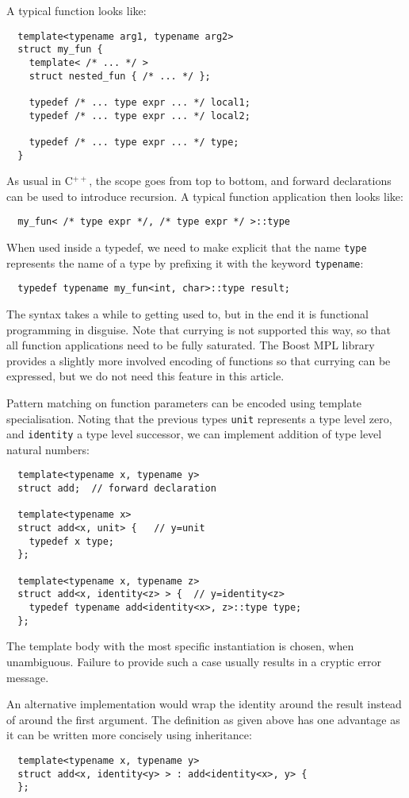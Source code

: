 \documentclass{llncs}
\newcommand*{\Cpp}{C\ensuremath{^{++}}}
\begin{document}
  A typical function looks like:
  \begin{lstlisting}
  template<typename arg1, typename arg2>
  struct my_fun {
    template< /* ... */ >
    struct nested_fun { /* ... */ };

    typedef /* ... type expr ... */ local1;
    typedef /* ... type expr ... */ local2;

    typedef /* ... type expr ... */ type;
  }
  \end{lstlisting}
  As usual in \Cpp, the scope goes from top to bottom,
  and forward declarations can be used to introduce recursion.
  A typical function application then looks like:
  \begin{lstlisting}
  my_fun< /* type expr */, /* type expr */ >::type
  \end{lstlisting}
  When used inside a typedef, we need to make explicit that the
  name \lstinline$type$ represents the name of a type by prefixing
  it with the keyword \lstinline$typename$:
  \begin{lstlisting}
  typedef typename my_fun<int, char>::type result;
  \end{lstlisting}
  The syntax takes a while to getting used to, but in the end it
  is functional programming in disguise.
  Note that currying is not supported this way, so that all
  function applications need to be fully saturated. The Boost MPL
  library provides a slightly more involved encoding of functions
  so that currying can be expressed, but we do not need this
  feature in this article.

  Pattern matching on function parameters can be encoded using
  template specialisation. Noting that the previous types
  \lstinline$unit$ represents a type level zero, and \lstinline$identity$
  a type level successor, we can implement
  addition of type level natural numbers:
  \begin{lstlisting}
  template<typename x, typename y>
  struct add;  // forward declaration

  template<typename x>
  struct add<x, unit> {   // y=unit
    typedef x type;
  };

  template<typename x, typename z>
  struct add<x, identity<z> > {  // y=identity<z>
    typedef typename add<identity<x>, z>::type type;
  };
  \end{lstlisting}
  The template body with the most specific instantiation is
  chosen, when unambiguous. Failure to provide such a case
  usually results in a cryptic error message.

  An alternative implementation would wrap the
  identity around the result instead of around the
  first argument. The definition as given above has
  one advantage as it can be written more concisely
  using inheritance:
  \begin{lstlisting}
  template<typename x, typename y>
  struct add<x, identity<y> > : add<identity<x>, y> {
  };
  \end{lstlisting}
\end{document}
